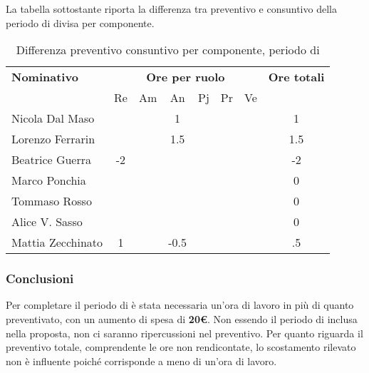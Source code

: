 La tabella sottostante riporta la differenza tra preventivo e consuntivo della periodo di \AR{} divisa per componente.
\begin{table}[H]
	\centering
	\begin{tabular}{|l|c|c|c|c|c|c|c|}
		\hline
		\textbf{Nominativo} & 
		\multicolumn{6}{c|}{\textbf{Ore per ruolo}} & 
		\textbf{Ore totali} \\
		& Re & Am & An & Pj & Pr & Ve & \\
		\hline
		Nicola Dal Maso & & &1 & & & & 1 \\
		Lorenzo Ferrarin & & &1.5 & & & & 1.5 \\
		Beatrice Guerra & -2 & & & & & & -2 \\
		Marco Ponchia & & & & & & & 0 \\
		Tommaso Rosso & & & & & & & 0 \\
		Alice V. Sasso & & & & & & & 0 \\
		Mattia Zecchinato & 1& &-0.5 & & & & .5  \\
		\hline
	\end{tabular}
	\caption{Differenza preventivo consuntivo per componente, periodo di \AR}
\end{table}
\subsubsection{Conclusioni}
Per completare il periodo di \AR{} è stata necessaria un'ora di lavoro in più di quanto preventivato, con un aumento di spesa di \textbf{20€}. Non essendo il periodo di \AR{} inclusa nella proposta, non ci saranno ripercussioni nel preventivo. Per quanto riguarda il preventivo totale, comprendente le ore non rendicontate, lo scostamento rilevato non è influente poiché corrisponde a meno di un'ora di lavoro.

